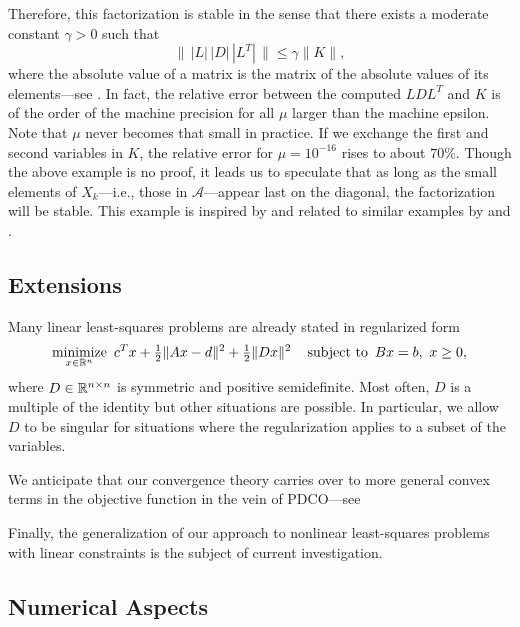 \documentclass{amsart}
\begin{document}
Therefore, this factorization is stable in the sense that there exists a
moderate constant $\gamma > 0$ such that
\[
  \| \, |L| \, |D| \, |L^T| \, \| \leq \gamma \|K\|,
\]
where the absolute value of a matrix is the matrix of the absolute values of
its elements---see \cite{golub-vanloan-1996}. In fact, the relative error
between the computed $LDL^T$ and $K$ is of the order of the machine precision for
all $\mu$ larger than the machine epsilon. Note that $\mu$ never becomes that
small in practice. If we exchange the first and second variables in $K$, the
relative error for $\mu = 10^{-16}$ rises to about $70\%$. Though the above
example is no proof, it leads us to speculate that as long as the small
elements of $X_k$---i.e., those in $\mathcal{A}$---appear last on the diagonal,
the factorization will be stable. This example is inspired by and related to
similar examples by \cite{vanderbei-1995} and
\cite{gill-saunders-shinnerl-1996}.

\subsection{Extensions}

Many linear least-squares problems are already stated in regularized form
\begin{equation}
  \label{eq:reg-lsq}
  \displaystyle\mathop{\textup{minimize}}_{x \in \mathbb{R}^n} \ c^T x + \tfrac{1}{2} \|Ax - d\|^2 + \tfrac{1}{2} \|Dx\|^2 \quad
  \mathop{\textup{subject to}} \ Bx = b, \ x \geq 0,
\end{equation}
where $D \in \mathbb{R}^{n \times n}$ is symmetric and positive semidefinite. Most
often, $D$ is a multiple of the identity but other situations are possible. In
particular, we allow $D$ to be singular for situations where the regularization
applies to a subset of the variables.

We anticipate that our convergence theory carries over to more general convex
terms in the objective function in the vein  of PDCO---see

Finally, the generalization of our approach to nonlinear least-squares
problems with linear constraints is the subject of current investigation.
\subsection{Numerical Aspects}
\end{document}
